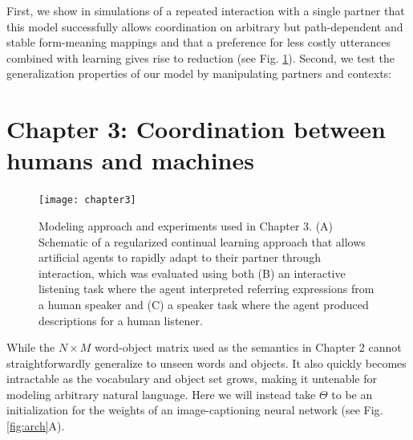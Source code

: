 \documentclass[11pt]{article}
\begin{document}

First, we show in simulations of a repeated interaction with a single partner that this model successfully allows coordination on arbitrary but path-dependent and stable form-meaning mappings and that a preference for less costly utterances combined with learning gives rise to reduction (see Fig. \ref{fig:modelresults}). Second, we test the generalization properties of our model by manipulating partners and contexts: 

\section*{Chapter 3: Coordination between humans and machines}

\begin{figure}[t]
\centering
\texttt{[image: chapter3]}
\caption{\small Modeling approach and experiments used in Chapter 3. (A) Schematic of a regularized continual learning approach that allows artificial agents to rapidly adapt to their partner through interaction, which was evaluated using both (B) an interactive listening task where the agent interpreted referring expressions from a human speaker and (C) a speaker task where the agent produced descriptions for a human listener.}
\label{fig:modelresults}
\end{figure}



While the $N \times M$ word-object matrix used as the semantics in Chapter 2 cannot straightforwardly generalize to unseen words and objects. 
It also quickly becomes intractable as the vocabulary and object set grows, making it untenable for modeling arbitrary natural language.
Here we will instead take $\Theta$ to be an initialization for the weights of an image-captioning neural network (see Fig. \ref{fig:arch}A).
\end{document}
